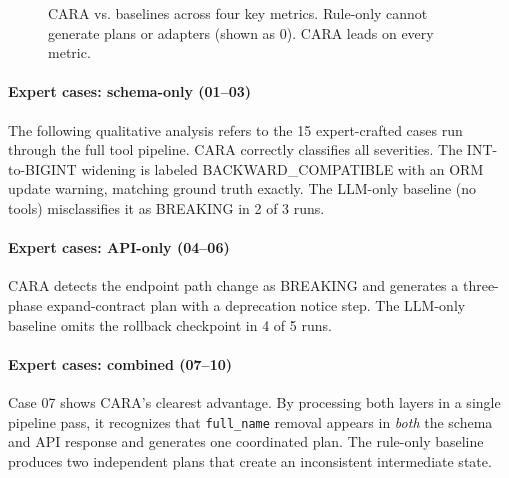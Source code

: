 \documentclass[10pt,twocolumn]{article}
\begin{document}
\begin{figure}[h]
\centering
{}
\caption{CARA vs. baselines across four key metrics. Rule-only cannot generate
         plans or adapters (shown as 0). CARA leads on every metric.}
\label{fig:results}
\end{figure}

\paragraph{Expert cases: schema-only (01--03)} The following qualitative analysis
refers to the 15 expert-crafted cases run through the full tool pipeline.
CARA correctly classifies all severities. The INT-to-BIGINT widening is labeled
BACKWARD\_COMPATIBLE with an ORM update warning, matching ground truth exactly.
The LLM-only baseline (no tools) misclassifies it as BREAKING in 2 of 3 runs.

\paragraph{Expert cases: API-only (04--06)} CARA detects the endpoint path change
as BREAKING and generates a three-phase expand-contract plan with a deprecation
notice step. The LLM-only baseline omits the rollback checkpoint in 4 of 5 runs.

\paragraph{Expert cases: combined (07--10)} Case 07 shows CARA's clearest advantage.
By processing both layers in a single pipeline pass, it recognizes that
\texttt{full\_name} removal appears in \emph{both} the schema and API response
and generates one coordinated plan. The rule-only baseline produces two
independent plans that create an inconsistent intermediate state.
\end{document}
